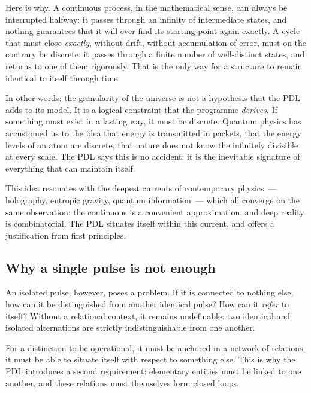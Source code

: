 \documentclass[12pt, a4paper, openright]{book}
\begin{document}
\medskip

Here is why. A continuous process, in the mathematical sense, can always be interrupted halfway: it passes through an infinity of intermediate states, and nothing guarantees that it will ever find its starting point again exactly. A cycle that must close \emph{exactly}, without drift, without accumulation of error, must on the contrary be discrete: it passes through a finite number of well-distinct states, and returns to one of them rigorously. That is the only way for a structure to remain identical to itself through time.

\medskip

In other words: the granularity of the universe is not a hypothesis that the PDL adds to its model. It is a logical constraint that the programme \emph{derives}. If something must exist in a lasting way, it must be discrete. Quantum physics has accustomed us to the idea that energy is transmitted in packets, that the energy levels of an atom are discrete, that nature does not know the infinitely divisible at every scale. The PDL says this is no accident: it is the inevitable signature of everything that can maintain itself.

\medskip

This idea resonates with the deepest currents of contemporary physics~--- holography, entropic gravity, quantum information~--- which all converge on the same observation: the continuous is a convenient approximation, and deep reality is combinatorial. The PDL situates itself within this current, and offers a justification from first principles.

\subsection*{Why a single pulse is not enough}

An isolated pulse, however, poses a problem. If it is connected to nothing else, how can it be distinguished from another identical pulse? How can it \emph{refer} to itself? Without a relational context, it remains undefinable: two identical and isolated alternations are strictly indistinguishable from one another.

\medskip

For a distinction to be operational, it must be anchored in a network of relations, it must be able to situate itself with respect to something else. This is why the PDL introduces a second requirement: elementary entities must be linked to one another, and these relations must themselves form closed loops.
\end{document}
